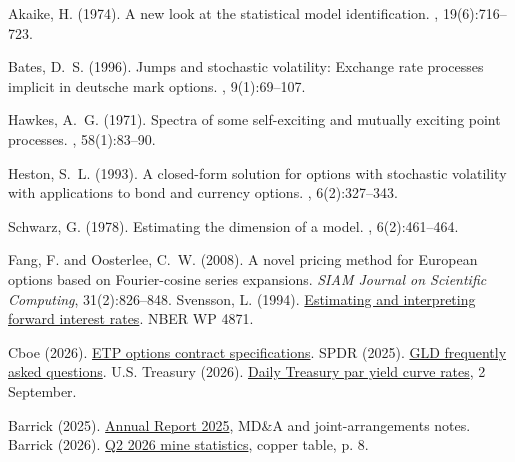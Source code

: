 \begin{thebibliography}{}

Akaike, H. (1974).
\newblock A new look at the statistical model identification.
, 19(6):716--723.

Bates, D.~S. (1996).
\newblock Jumps and stochastic volatility: Exchange rate processes implicit in
  deutsche mark options.
, 9(1):69--107.

Hawkes, A.~G. (1971).
\newblock Spectra of some self-exciting and mutually exciting point processes.
, 58(1):83--90.

Heston, S.~L. (1993).
\newblock A closed-form solution for options with stochastic volatility with
  applications to bond and currency options.
, 6(2):327--343.

Schwarz, G. (1978).
\newblock Estimating the dimension of a model.
, 6(2):461--464.

Fang, F. and Oosterlee, C.~W. (2008). A novel pricing method for European options based on Fourier-cosine series expansions. {\em SIAM Journal on Scientific Computing}, 31(2):826--848.
Svensson, L. (1994). \href{https://www.nber.org/papers/w4871}{Estimating and interpreting forward interest rates}. NBER WP 4871.

Cboe (2026). \href{https://www.cboe.com/exchange-traded-stock/etp-options-spec}{ETP options contract specifications}.
SPDR (2025). \href{https://files.spdrgoldshares.com/spdr-cms/2025-10/GLD-FAQs-January-2025.pdf}{GLD frequently asked questions}.
U.S. Treasury (2026). \href{https://home.treasury.gov/resource-center-data-chart-center/interest-rates}{Daily Treasury par yield curve rates}, 2 September.

Barrick (2025). \href{https://s25.q4cdn.com/322814910/files/doc_financial/annual_reports/2025/Barrick_Annual_Report_2025.pdf}{Annual Report 2025}, MD\&A and joint-arrangements notes.
Barrick (2026). \href{https://s25.q4cdn.com/322814910/files/doc_financial/quarterly_results/2026/q2/Barrick_Q2_2026_Mine_Stats.pdf}{Q2 2026 mine statistics}, copper table, p. 8.


\end{thebibliography}
